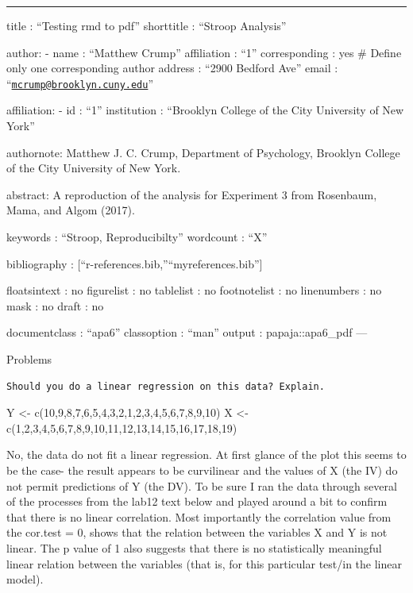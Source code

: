 \documentclass[
  english,
  man]{article}
\author{\phantom{0}}
\date{}
\affiliation{\phantom{0}}
\begin{document}
\begin{center}\rule{0.5\linewidth}{0.5pt}\end{center}

title : ``Testing rmd to pdf''
shorttitle : ``Stroop Analysis''

author:
- name : ``Matthew Crump''
affiliation : ``1''
corresponding : yes \# Define only one corresponding author
address : ``2900 Bedford Ave''
email : ``\href{mailto:mcrump@brooklyn.cuny.edu}{\nolinkurl{mcrump@brooklyn.cuny.edu}}''

affiliation:
- id : ``1''
institution : ``Brooklyn College of the City University of New York''

authornote: \textbar{}
Matthew J. C. Crump, Department of Psychology, Brooklyn College of the City University of New York.

abstract: \textbar{}
A reproduction of the analysis for Experiment 3 from Rosenbaum, Mama, and Algom (2017).

keywords : ``Stroop, Reproducibilty''
wordcount : ``X''

bibliography : {[}``r-references.bib,''``myreferences.bib''{]}

floatsintext : no
figurelist : no
tablelist : no
footnotelist : no
linenumbers : no
mask : no
draft : no

documentclass : ``apa6''
classoption : ``man''
output : papaja::apa6\_pdf
---

Problems

\begin{verbatim}
Should you do a linear regression on this data? Explain.
\end{verbatim}

Y \textless- c(10,9,8,7,6,5,4,3,2,1,2,3,4,5,6,7,8,9,10)
X \textless- c(1,2,3,4,5,6,7,8,9,10,11,12,13,14,15,16,17,18,19)

No, the data do not fit a linear regression. At first glance of the plot this seems to be the case- the result appears to be curvilinear and the values of X (the IV) do not permit predictions of Y (the DV). To be sure I ran the data through several of the processes from the lab12 text below and played around a bit to confirm that there is no linear correlation. Most importantly the correlation value from the cor.test = 0, shows that the relation between the variables X and Y is not linear. The p value of 1 also suggests that there is no statistically meaningful linear relation between the variables (that is, for this particular test/in the linear model).
\end{document}
